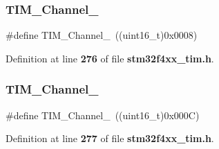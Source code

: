 \subsubsection{T\+I\+M\+\_\+\+Channel\+\_}
{\footnotesize\ttfamily \#define T\+I\+M\+\_\+\+Channel\+\_~((uint16\+\_\+t)0x0008)}



Definition at line \textbf{ 276} of file \textbf{ stm32f4xx\+\_\+tim.\+h}.

\mbox{\label{group__TIM__Channel_ga7414888c40d066af235bc1f80b99bd9d}} 
\subsubsection{T\+I\+M\+\_\+\+Channel\+\_}
{\footnotesize\ttfamily \#define T\+I\+M\+\_\+\+Channel\+\_~((uint16\+\_\+t)0x000\+C)}



Definition at line \textbf{ 277} of file \textbf{ stm32f4xx\+\_\+tim.\+h}.

